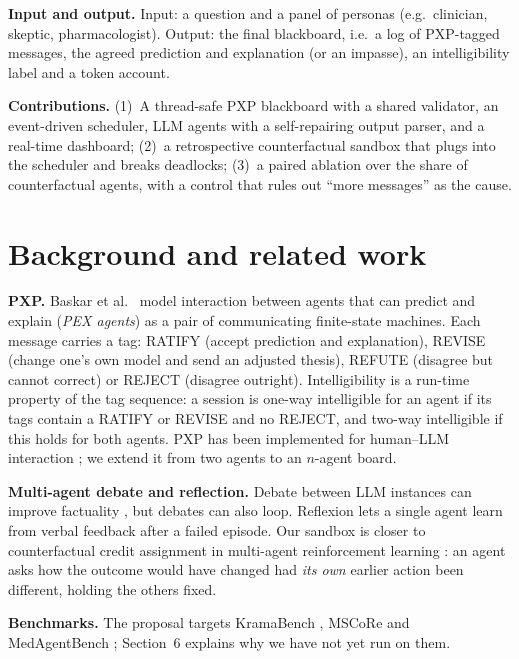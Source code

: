 \documentclass[11pt,a4paper,twocolumn]{article}
\begin{document}
\textbf{Input and output.} Input: a question and a panel of personas (e.g.\ clinician,
skeptic, pharmacologist). Output: the final blackboard, i.e.\ a log of PXP-tagged
messages, the agreed prediction and explanation (or an impasse), an intelligibility
label and a token account.

\textbf{Contributions.} (1)~A thread-safe PXP blackboard with a shared validator, an
event-driven scheduler, LLM agents with a self-repairing output parser, and a
real-time dashboard; (2)~a retrospective counterfactual sandbox that plugs into the
scheduler and breaks deadlocks; (3)~a paired ablation over the share of
counterfactual agents, with a control that rules out ``more messages'' as the cause.

\section{Background and related work}
\textbf{PXP.} Baskar et al.\ \cite{baskar2023pxp} model interaction between agents that
can predict and explain (\emph{PEX agents}) as a pair of communicating finite-state
machines. Each message carries a tag: RATIFY (accept prediction and explanation),
REVISE (change one's own model and send an adjusted thesis), REFUTE (disagree but
cannot correct) or REJECT (disagree outright). Intelligibility is a run-time property of
the tag sequence: a session is one-way intelligible for an agent if its tags contain a
RATIFY or REVISE and no REJECT, and two-way intelligible if this holds for both agents.
PXP has been implemented for human--LLM interaction \cite{srinivasan2024pxp}; we
extend it from two agents to an $n$-agent board.

\textbf{Multi-agent debate and reflection.} Debate between LLM instances can improve
factuality \cite{du2024debate}, but debates can also loop. Reflexion
\cite{shinn2023reflexion} lets a single agent learn from verbal feedback after a failed
episode. Our sandbox is closer to counterfactual credit assignment in multi-agent
reinforcement learning \cite{foerster2018coma}: an agent asks how the outcome would have
changed had \emph{its own} earlier action been different, holding the others fixed.

\textbf{Benchmarks.} The proposal targets KramaBench \cite{lai2025kramabench}, MSCoRe
\cite{lei2025mscore} and MedAgentBench \cite{jiang2025medagentbench}; Section~6 explains
why we have not yet run on them.
\end{document}
